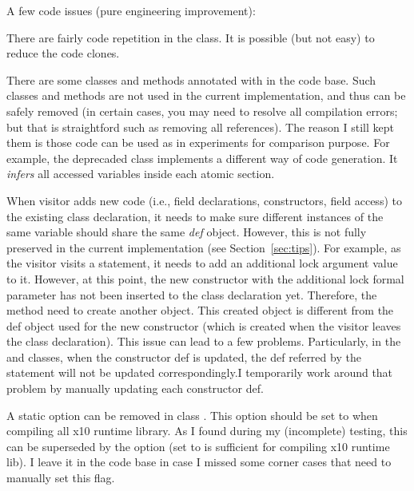 \documentclass{article}
\begin{document}
\begin{enumerate}
\Item A few code issues (pure engineering improvement):

\begin{itemize}
\Item There are fairly code repetition in the  class. It is possible (but not easy) to reduce the code clones.

\Item There are some classes and methods annotated with   in the code base. Such classes and methods are not used in the current implementation, and thus can be safely removed (in certain cases, you may need to resolve all compilation errors; but that is straightford such as removing all references). The reason I still kept them is  those code can be used as in experiments for comparison purpose. For example, the deprecaded class  implements a different way of code generation. It \textit{infers} all accessed variables inside each atomic section.

\Item When visitor  adds new code (i.e., field declarations, constructors, field access) to the existing class declaration,  it needs to make sure different instances of the same variable should share the same \textit{def} object. However, this is not fully preserved in the current implementation (see Section~\ref{sec:tips}). For example, as the visitor  visits  a  statement, it needs to add an additional lock argument value to it. However, at this point, the new constructor with the additional lock formal parameter has not been inserted to the class declaration yet. Therefore, the  method need to create another  object. This created  object is different from the def object used for the new constructor (which is created when the visitor leaves the class declaration). This issue can lead to a few problems. Particularly, in the  and   classes, when the constructor def is updated, the def referred by the  statement will not be updated correspondingly.I temporarily work around that problem by manually updating each constructor def.

\Item A static option  can be removed in class . This option should be set to  when compiling all x10 runtime library.  As I found during my (incomplete) testing, this  can be superseded by the  option (set  to  is sufficient for compiling x10 runtime lib). I leave it in the code base in case I missed some corner cases that need to manually set this flag.
\end{itemize}


\end{enumerate}
\end{document}
